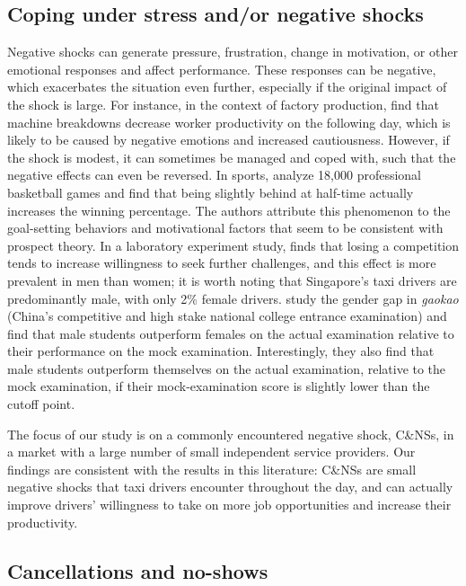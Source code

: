 \documentclass[reviewmode]{AEA}
\begin{document}
\subsection{Coping under stress and/or negative shocks}

Negative shocks can generate pressure, frustration, change in motivation, or other emotional responses and affect performance.  These responses can be negative, which exacerbates the situation even further, especially if the original impact of the shock is large. For instance, in the context of factory production, \citet{cai2017recover} find that machine breakdowns decrease worker productivity on the following day, which is likely to be caused by negative emotions and increased cautiousness. However, if the shock is modest, it can sometimes be managed and coped with, such that the negative effects can even be reversed. In sports, \citet{berger2011can} analyze 18,000 professional basketball games and find that being slightly behind at half-time actually increases the winning percentage. The authors attribute this phenomenon to the goal-setting behaviors and motivational factors that seem to be consistent with prospect theory. In a laboratory experiment study, \citet{buser2016impact}  finds that losing a competition tends to increase willingness to seek further challenges, and this effect is more prevalent in men than women; it is worth noting that Singapore's taxi drivers are predominantly male, with only 2\% female drivers. \citet{cai2016gender} study the gender gap in \emph{gaokao} (China's competitive and high stake national college entrance examination) and find that male students outperform females on the actual examination relative to their performance on the mock examination. Interestingly, they also find that male students outperform themselves on the actual examination, relative to the mock examination, if their mock-examination score is slightly lower than the cutoff point. 


The focus of our study is on a commonly encountered negative shock, C\&NSs, in a market with a large number of small independent service providers.
Our findings are consistent with the results in this literature: C\&NSs are small negative shocks that taxi drivers encounter throughout the day, and can actually improve drivers' willingness to take on more job opportunities and increase their productivity.

\subsection{Cancellations and no-shows}
\end{document}
